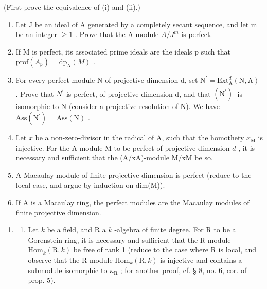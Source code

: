 (First prove the equivalence of (i) and (ii).)

\begin{enumerate}
\def\labelenumi{\alph{enumi})}
\setcounter{enumi}{1}
\item
  Let J be an ideal of A generated by a completely secant sequence, and let m be an integer \(\geqslant 1\) . Prove that the A-module \(A/J^{m}\) is perfect.
\item
  If M is perfect, its associated prime ideals are the ideals p such that \(\text{prof}(A_{\mathfrak{p}}) = \text{dp}_{\mathrm{A}}(M)\) .
\item
  For every perfect module N of projective dimension d, set \(\mathrm{N}^{\prime} = \mathrm{Ext}_{\mathrm{A}}^{d}(\mathrm{N}, \mathrm{A})\) . Prove that \(N^{\prime}\) is perfect, of projective dimension d, and that \((\mathrm{N}^{\prime})^{\prime}\) is isomorphic to N (consider a projective resolution of N). We have \(\mathrm{Ass}(\mathrm{N}^{\prime}) = \mathrm{Ass}(\mathrm{N})\) .
\item
  Let \(x\) be a non-zero-divisor in the radical of A, such that the homothety \(x_{\mathrm{M}}\) is injective. For the A-module M to be perfect of projective dimension \(d\) , it is necessary and sufficient that the (A/xA)-module M/xM be so.
\item
  A Macaulay module of finite projective dimension is perfect (reduce to the local case, and argue by induction on dim(M)).
\item
  If A is a Macaulay ring, the perfect modules are the Macaulay modules of finite projective dimension.
\end{enumerate}

\begin{enumerate}
\def\labelenumi{\arabic{enumi})}
\setcounter{enumi}{4}
\tightlist
\item
  \begin{enumerate}
  \def\labelenumii{\alph{enumii})}
  \tightlist
  \item
    Let \(k\) be a field, and R a \(k\) -algebra of finite degree. For R to be a Gorenstein ring, it is necessary and sufficient that the R-module \(\mathrm{Hom}_{k}(\mathrm{R}, k)\) be free of rank 1 (reduce to the case where R is local, and observe that the R-module \(\mathrm{Hom}_{k}(\mathrm{R}, k)\) is injective and contains a submodule isomorphic to \(\kappa_{\mathrm{R}}\) ; for another proof, cf. § 8, no. 6, cor. of prop. 5).
  \end{enumerate}
\end{enumerate}

